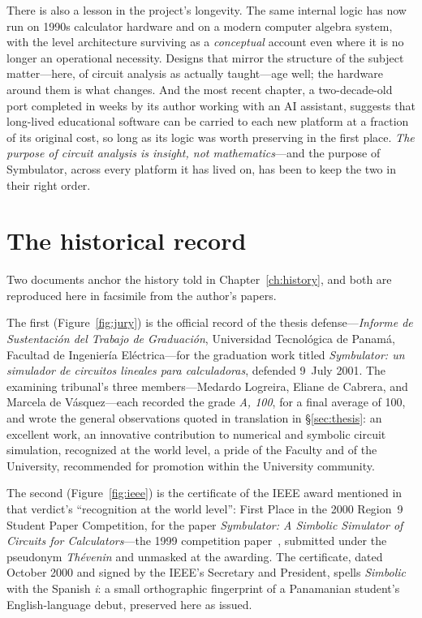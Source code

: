 \documentclass[11pt,oneside]{report}
\begin{document}
There is also a lesson in the project's longevity. The same internal
logic has now run on 1990s calculator hardware and on a modern
computer algebra system, with the level architecture surviving
as a \emph{conceptual} account even where it is no longer an
operational necessity. Designs that mirror the structure of the
subject matter---here, of circuit analysis as actually taught---age
well; the hardware around them is what changes. And the most recent
chapter, a two-decade-old port completed in weeks by its author
working with an AI assistant, suggests that long-lived educational
software can be carried to each new platform at a fraction of its
original cost, so long as its logic was worth preserving in the first
place. \emph{The purpose of circuit analysis is insight, not
mathematics}---and the purpose of Symbulator, across every platform it
has lived on, has been to keep the two in their right order.

\appendix
\chapter{The historical record}
\label{app:documents}

Two documents anchor the history told in Chapter~\ref{ch:history},
and both are reproduced here in facsimile from the author's papers.

The first (Figure~\ref{fig:jury}) is the official record of the
thesis defense---\emph{Informe de Sustentaci\'on del Trabajo de
Graduaci\'on}, Universidad Tecnol\'ogica de Panam\'a, Facultad de
Ingenier\'ia El\'ectrica---for the graduation work titled
\emph{Symbulator: un simulador de circuitos lineales para
calculadoras}, defended 9~July 2001. The examining tribunal's three
members---Medardo Logreira, Eliane de Cabrera, and Marcela de
V\'asquez---each recorded the grade \emph{A, 100}, for a final
average of 100, and wrote the general observations quoted in
translation in \S\ref{sec:thesis}: an excellent work, an innovative
contribution to numerical and symbolic circuit simulation,
recognized at the world level, a pride of the Faculty and of the
University, recommended for promotion within the University
community.

The second (Figure~\ref{fig:ieee}) is the certificate of the IEEE
award mentioned in that verdict's ``recognition at the world
level'': First Place in the 2000 Region~9 Student Paper Competition,
for the paper \emph{Symbulator: A Simbolic Simulator of Circuits for
Calculators}---the 1999 competition paper~\cite{paper1999},
submitted under the pseudonym \emph{Th\'evenin} and unmasked at the
awarding. The certificate, dated October 2000 and signed by the
IEEE's Secretary and President, spells \emph{Simbolic} with the
Spanish \emph{i}: a small orthographic fingerprint of a
Panamanian student's English-language debut, preserved here as
issued.
\end{document}
